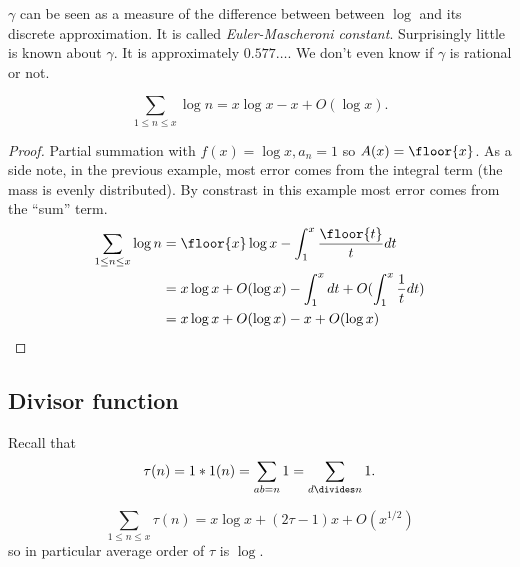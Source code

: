 \documentclass[a4paper]{article}
\begin{document}
\(\gamma\) can be seen as a measure of the difference between between \(\log\) and its discrete approximation. It is called \emph{Euler-Mascheroni constant}. 
Surprisingly little is known about \(\gamma\). It is approximately \(0.577\dots\). We don't even know if \(\gamma\) is rational or not.

\begin{lemma}
  \[
    \sum_{1 \leq n \leq x} \log n = x \log x - x + O(\log x).
  \]
\end{lemma}

\begin{proof}
  Partial summation with \(f(x) = \log x, a_n = 1\) so \(A(x) = \floor{x}\). As a side note, in the previous example, most error comes from the integral term (the mass is evenly distributed). By constrast in this example most error comes from the ``sum'' term.
  \begin{align*}
    \sum_{1 \leq n \leq x} \log n
    &= \floor{x} \log x - \int_1^x \frac{\floor{t}}{t} dt \\
    &= x \log x + O(\log x) - \int_1^x dt + O(\int_1^x \frac{1}{t}dt) \\
    &= x \log x + O(\log x) - x + O(\log x)
  \end{align*}
\end{proof}

\subsection{Divisor function}

Recall that
\[
  \tau(n) = 1 * 1(n) = \sum_{ab = n} 1 = \sum_{d \divides n} 1.
\]

\begin{theorem}
  \[
    \sum_{1 \leq n \leq x} \tau(n) = x \log x + (2 \tau - 1) x + O(x^{1/2})
  \]
  so in particular average order of \(\tau\) is \(\log\).
\end{theorem}
\end{document}
